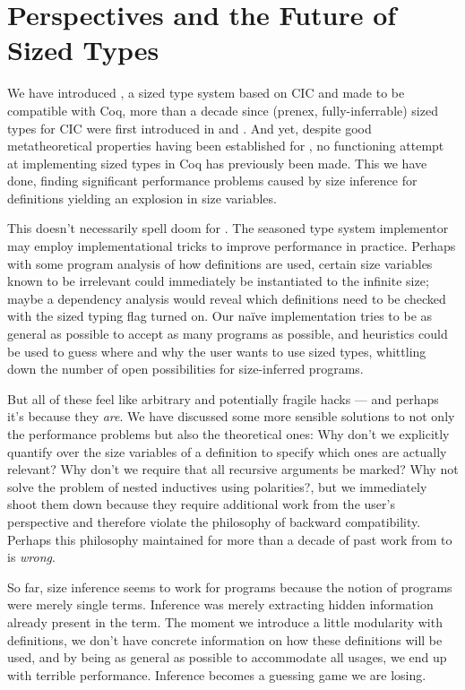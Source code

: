 \section{Perspectives and the Future of Sized Types}
\label{sec:conclusion}

We have introduced \lang, a sized type system based on CIC and made to be compatible with Coq,
more than a decade since (prenex, fully-inferrable) sized types for CIC were first introduced in \CIChat and \CIChatminus.
And yet, despite good metatheoretical properties having been established for \CIChatminus,
no functioning attempt at implementing sized types in Coq has previously been made.
This we have done, finding significant performance problems caused by size inference for definitions yielding an explosion in size variables.

This doesn't necessarily spell doom for \lang.
The seasoned type system implementor may employ implementational tricks to improve performance in practice.
Perhaps with some program analysis of how definitions are used, certain size variables known to be irrelevant could immediately be instantiated to the infinite size;
maybe a dependency analysis would reveal which definitions need to be checked with the sized typing flag turned on.
Our na\"ive implementation tries to be as general as possible to accept as many programs as possible,
and heuristics could be used to guess where and why the user wants to use sized types,
whittling down the number of open possibilities for size-inferred programs.

But all of these feel like arbitrary and potentially fragile hacks --- and perhaps it's because they \emph{are}.
We have discussed some more sensible solutions to not only the performance problems but also the theoretical ones:
Why don't we explicitly quantify over the size variables of a definition to specify which ones are actually relevant?
Why don't we require that all recursive arguments be marked?
Why not solve the problem of nested inductives using polarities?,
but we immediately shoot them down because they require additional work from the user's perspective and therefore violate the philosophy of backward compatibility.
Perhaps this philosophy maintained for more than a decade of past work from \lambdahat to \CIChatsub is \emph{wrong}.

So far, size inference seems to work for programs because the notion of programs were merely single terms.
Inference was merely extracting hidden information already present in the term.
The moment we introduce a little modularity with definitions,
we don't have concrete information on how these definitions will be used,
and by being as general as possible to accommodate all usages,
we end up with terrible performance.
Inference becomes a guessing game we are losing.

